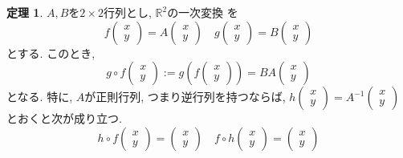 \documentclass[dvipdfmx,a4paper,11pt]{article}
\newcommand{\R}{\mathbb{R}}
\theoremstyle{definition}
\newtheorem{thm}{定理}
\begin{document}
 \begin{tcolorbox}[
    colback = white,
    colframe = green!35!black,
    fonttitle = \bfseries,
    breakable = true]
    \begin{thm}
$A,B$を$2 \times 2$行列とし, $\R^2$の一次変換
を    
  $$
f\begin{pmatrix}
x \\ y
 \end{pmatrix} 
 =
 A
\begin{pmatrix}
x \\ y
 \end{pmatrix}  
\quad
g\begin{pmatrix}
x \\ y
 \end{pmatrix} 
 =
 B
\begin{pmatrix}
x \\ y
 \end{pmatrix}  
$$
 とする. 
 このとき, 
 $$
 g\circ f 
 \begin{pmatrix}
x \\ y
 \end{pmatrix}  
 := g \left( 
 f\begin{pmatrix}
x \\ y
 \end{pmatrix} 
 \right)
 =BA \begin{pmatrix}
x \\ y
 \end{pmatrix} 
 $$
 となる. 
特に, $A$が正則行列, つまり逆行列を持つならば, 
$
h\begin{pmatrix}
x \\ y
 \end{pmatrix} 
 =
 A^{-1}
\begin{pmatrix}
x \\ y
 \end{pmatrix}  
 $
 とおくと次が成り立つ.
 $$
  h\circ f 
 \begin{pmatrix}
x \\ y
 \end{pmatrix}  
 =
  \begin{pmatrix}
x \\ y
 \end{pmatrix}  
 \quad 
  f\circ h 
 \begin{pmatrix}
x \\ y
 \end{pmatrix}  
 =
  \begin{pmatrix}
x \\ y
 \end{pmatrix}  
 $$
\end{thm}
 \end{tcolorbox}
 
\end{document}
